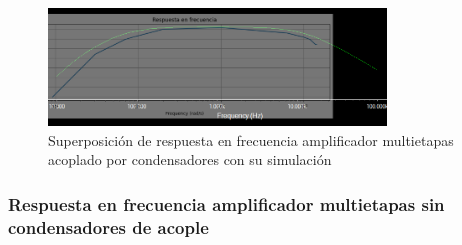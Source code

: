 \begin{figure}[ht]
    \centering
    \includegraphics[width=0.8\textwidth]{src/images/resultados/p4/superposicion respuesta en frecuencia con condensadores.png}
    \caption{Superposición de respuesta en frecuencia amplificador multietapas acoplado por condensadores con su simulación}
    \label{fig:superposicion-respuesta-frecuencia-amplificador-multietapas-acoplado-condensadores}
\end{figure}

\FloatBarrier
\subsubsection{Respuesta en frecuencia amplificador multietapas sin condensadores de acople}

